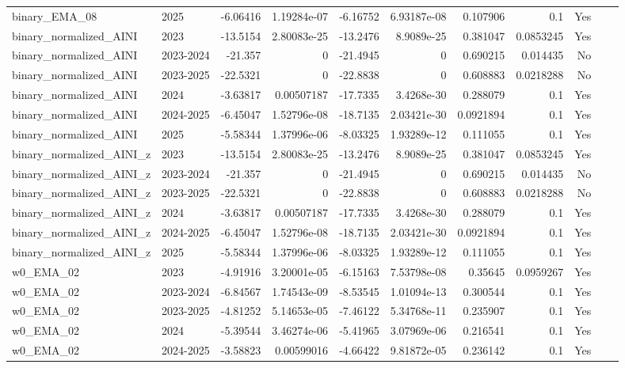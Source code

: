 \begin{longtable}{llrrrrrrrrl}
binary\_EMA\_08 & 2025 & -6.06416 & 1.19284e-07 & -6.16752 & 6.93187e-08 & 0.107906 & 0.1 & Yes &  \\
binary\_normalized\_AINI & 2023 & -13.5154 & 2.80083e-25 & -13.2476 & 8.9089e-25 & 0.381047 & 0.0853245 & Yes &  \\
binary\_normalized\_AINI & 2023-2024 & -21.357 & 0 & -21.4945 & 0 & 0.690215 & 0.014435 & No &  \\
binary\_normalized\_AINI & 2023-2025 & -22.5321 & 0 & -22.8838 & 0 & 0.608883 & 0.0218288 & No &  \\
binary\_normalized\_AINI & 2024 & -3.63817 & 0.00507187 & -17.7335 & 3.4268e-30 & 0.288079 & 0.1 & Yes &  \\
binary\_normalized\_AINI & 2024-2025 & -6.45047 & 1.52796e-08 & -18.7135 & 2.03421e-30 & 0.0921894 & 0.1 & Yes &  \\
binary\_normalized\_AINI & 2025 & -5.58344 & 1.37996e-06 & -8.03325 & 1.93289e-12 & 0.111055 & 0.1 & Yes &  \\
binary\_normalized\_AINI\_z & 2023 & -13.5154 & 2.80083e-25 & -13.2476 & 8.9089e-25 & 0.381047 & 0.0853245 & Yes &  \\
binary\_normalized\_AINI\_z & 2023-2024 & -21.357 & 0 & -21.4945 & 0 & 0.690215 & 0.014435 & No &  \\
binary\_normalized\_AINI\_z & 2023-2025 & -22.5321 & 0 & -22.8838 & 0 & 0.608883 & 0.0218288 & No &  \\
binary\_normalized\_AINI\_z & 2024 & -3.63817 & 0.00507187 & -17.7335 & 3.4268e-30 & 0.288079 & 0.1 & Yes &  \\
binary\_normalized\_AINI\_z & 2024-2025 & -6.45047 & 1.52796e-08 & -18.7135 & 2.03421e-30 & 0.0921894 & 0.1 & Yes &  \\
binary\_normalized\_AINI\_z & 2025 & -5.58344 & 1.37996e-06 & -8.03325 & 1.93289e-12 & 0.111055 & 0.1 & Yes &  \\
w0\_EMA\_02 & 2023 & -4.91916 & 3.20001e-05 & -6.15163 & 7.53798e-08 & 0.35645 & 0.0959267 & Yes &  \\
w0\_EMA\_02 & 2023-2024 & -6.84567 & 1.74543e-09 & -8.53545 & 1.01094e-13 & 0.300544 & 0.1 & Yes &  \\
w0\_EMA\_02 & 2023-2025 & -4.81252 & 5.14653e-05 & -7.46122 & 5.34768e-11 & 0.235907 & 0.1 & Yes &  \\
w0\_EMA\_02 & 2024 & -5.39544 & 3.46274e-06 & -5.41965 & 3.07969e-06 & 0.216541 & 0.1 & Yes &  \\
w0\_EMA\_02 & 2024-2025 & -3.58823 & 0.00599016 & -4.66422 & 9.81872e-05 & 0.236142 & 0.1 & Yes &  \\

\end{longtable}
